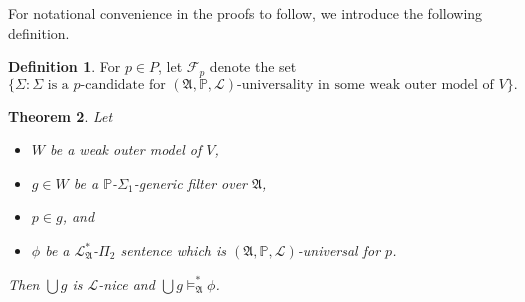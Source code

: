 \documentclass[12pt, twoside]{memoir}
\numberwithin{equation}{section}
\newtheorem{thm}{Theorem}[section]
\theoremstyle{definition}
\newtheorem{defi}[thm]{Definition}
\theoremstyle{remark}
\theoremstyle{definition}
\theoremstyle{definition}
\theoremstyle{definition}
\theoremstyle{remark}
\begin{document}
For notational convenience in the proofs to follow, we introduce the following definition.

\begin{defi}
For $p \in P$, let $\mathcal{F}_p$ denote the set 
\begin{equation*}
    \{\Sigma : \Sigma \text{ is a } p \text{-candidate for } (\mathfrak{A}, \mathbb{P}, \mathcal{L}) \text{-universality in some weak outer model of } V\}.
\end{equation*}
\end{defi}

\begin{thm}\label{uni}
Let 
\begin{itemize} 
    \item $W$ be a weak outer model of $V$,
    \item $g \in W$ be a $\mathbb{P}$-$\Sigma_1$-generic filter over $\mathfrak{A}$,
    \item $p \in g$, and
    \item $\phi$ be a $\mathcal{L}^{*}_{\mathfrak{A}}$-$\Pi_2$ sentence which is $(\mathfrak{A}, \mathbb{P}, \mathcal{L})$-universal for $p$.
\end{itemize} 
Then $\bigcup g$ is $\mathcal{L}$-nice and $\bigcup g \models^{*}_{\mathfrak{A}} \phi$.
\end{thm}
\end{document}
